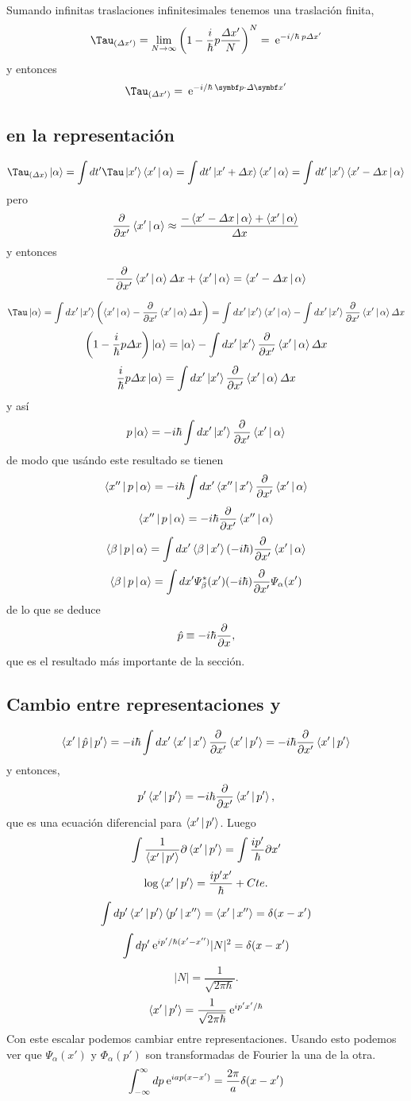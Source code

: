 \documentclass[10pt,oneside]{CBFT_book}
\begin{document}
Sumando infinitas traslaciones infinitesimales tenemos una traslación finita,
\[
	\Tau_{(\Delta x')} = \lim_{N\to \infty}\left( 1 - \frac{i}{\hbar}p\frac{\Delta x'}{N}\right)^N 
		= \euler^{-i/\hbar \: p\Delta x'}
\]
y entonces 
\[
	\Tau_{(\Delta x')} = \euler^{-i/\hbar\: \vb{p}\cdot\Delta \vb{x}'}
\]


\subsection{ en la representación }

\[
	\Tau_{(\Delta x)} \Ket{\alpha} = \int dt' \Tau\Ket{x'}\Braket{x'|\alpha} = 
		\int dt' \Ket{x'+ \Delta x}\Braket{x'|\alpha} = \int dt' \Ket{x'}\Braket{x'-\Delta x|\alpha}
\]
pero
\[
	\frac{\partial^{\hspace{-0.05em}} {}}{\partial {x'}^{\hspace{-0.05em}}} \Braket{x'|\alpha} \approx \frac{ -\Braket{x'-\Delta x|\alpha} + \Braket{x'|\alpha} }{\Delta x}
\]
y entonces
\[
	-\frac{\partial^{\hspace{-0.05em}} {}}{\partial {x'}^{\hspace{-0.05em}}} \Braket{x'|\alpha} \Delta x + \Braket{x'|\alpha}  = \Braket{x'-\Delta x|\alpha}
\]

\[
	\Tau\Ket{\alpha} = \int dx' \Ket{x'}\left( \Braket{x'|\alpha} -\dpar{}{x'} \Braket{x'|\alpha} \Delta x \right) =
	\int dx' \Ket{x'} \Braket{x'|\alpha} - \int dx' \Ket{x'}  \dpar{}{x'} \Braket{x'|\alpha} \Delta x 
\]
\[
	\left( 1 - \frac{i}{\hbar}p\Delta x \right) \Ket{\alpha} = 
		\Ket{\alpha} - \int dx' \Ket{x'}  \frac{\partial^{\hspace{-0.05em}} {}}{\partial {x'}^{\hspace{-0.05em}}} \Braket{x'|\alpha} \Delta x
\]
\[
	\frac{i}{\hbar}p\Delta x \Ket{\alpha} = \int dx' \Ket{x'}  \frac{\partial^{\hspace{-0.05em}} {}}{\partial {x'}^{\hspace{-0.05em}}} \Braket{x'|\alpha} \Delta x
\]
y así
\[
	p\Ket{\alpha} = -i\hbar \int dx' \Ket{x'}  \frac{\partial^{\hspace{-0.05em}} {}}{\partial {x'}^{\hspace{-0.05em}}} \Braket{x'|\alpha}
\]
de modo que usándo este resultado se tienen
\[
	\Braket{x''|p|\alpha} = -i\hbar \int dx' \Braket{x''|x'}  \frac{\partial^{\hspace{-0.05em}} {}}{\partial {x'}^{\hspace{-0.05em}}} \Braket{x'|\alpha}
\]
\[
	\Braket{x''|p|\alpha} = -i\hbar \frac{\partial^{\hspace{-0.05em}} {}}{\partial {x'}^{\hspace{-0.05em}}} \Braket{x''|\alpha}
\]
\[
	\Braket{\beta|p|\alpha} = \int dx' \Braket{\beta|x'} (-i\hbar) \frac{\partial^{\hspace{-0.05em}} {}}{\partial {x'}^{\hspace{-0.05em}}} \Braket{x'|\alpha}
\]
\[
	\Braket{\beta|p|\alpha} = \int dx' \Psi_\beta^*(x') (-i\hbar) \frac{\partial^{\hspace{-0.05em}} {}}{\partial {x'}^{\hspace{-0.05em}}} \Psi_\alpha(x')
\]
de lo que se deduce 
\[
	\hat{p} \equiv - i \hbar \frac{\partial^{\hspace{-0.05em}} {}}{\partial {x}^{\hspace{-0.05em}}},
\]
que es el resultado más importante de la sección.

\subsection{Cambio entre representaciones  y  }

\[
	\Braket{x'|\hat{p}|p'} =  -i\hbar \int dx'  \Braket{x'|x'} \frac{\partial^{\hspace{-0.05em}} {}}{\partial {x'}^{\hspace{-0.05em}}} \Braket{x'|p'} =
	-i\hbar \frac{\partial^{\hspace{-0.05em}} {}}{\partial {x'}^{\hspace{-0.05em}}} \Braket{x'|p'}
\]
y entonces,
\[
	p' \Braket{x'|p'} = -i\hbar \frac{\partial^{\hspace{-0.05em}} {}}{\partial {x'}^{\hspace{-0.05em}}} \Braket{x'|p'},
\]
que es una ecuación diferencial para $\Braket{x'|p'}$. Luego
\[
	\int  \frac{1}{\Braket{x'|p'}} \partial \Braket{x'|p'} = \int \frac{ip'}{\hbar} \partial x'
\]
\[
	\log \Braket{x'|p'} = \frac{ip'x'}{\hbar} + Cte.
\]
\[
	\int dp' \Braket{x'|p'} \Braket{p'|x''} = \Braket{x'|x''} = \delta(x-x')
\]
\[
	\int dp' \:\mathrm{e}^{ip'/\hbar(x'-x'')} |N|^2 = \delta(x-x')
\]
\[
	|N| = \frac{1}{\sqrt{2\pi\hbar}}.
\]
\[
	\Braket{x'|p'} = \frac{1}{\sqrt{2\pi\hbar}} \:\mathrm{e}^{i p'x'/\hbar}
\]
Con este escalar podemos cambiar entre representaciones.
Usando esto podemos ver que $\Psi_\alpha(x')$ y $\Phi_\alpha(p')$ son transformadas de Fourier la una de la otra.
\[
	 \int_{-\infty}^\infty dp \:\mathrm{e}^{iap(x-x')} = \frac{2\pi}{a}\delta(x-x')
\]
\end{document}
